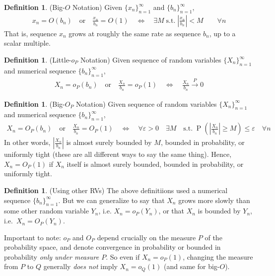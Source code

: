 \documentclass[12pt]{article}
\theoremstyle{plain}
\theoremstyle{definition}
\newtheorem{defn}[thm]{Definition}
\theoremstyle{remark}
\newcommand{\Prb}{\operatorname{P}}
\newcommand{\pto}{\xrightarrow{P}}
\newcommand{\ninf}{_{n=1}^\infty}
\begin{document}
\begin{defn}(Big-$O$ Notation)
Given $\{x_n\}_{n=1}^\infty$ and $\{b_n\}_{n=1}^\infty$,
\begin{align*}
  x_n = O(b_n)
  \quad\text{or} \quad
  \frac{x_n}{b_n} = O(1)
  \quad \iff \quad
  \exists M \; \text{s.t.} \;
  \left\lvert
  \frac{x_n}{b_n}
  \right\rvert
  < M
  \qquad \forall n
\end{align*}
That is, sequence $x_n$ grows at roughly the same rate as sequence
$b_n$, up to a scalar multiple.
\end{defn}

\begin{defn}(Little-$o_P$ Notation)
Given sequence of random variables $\{X_n\}_{n=1}^\infty$ and numerical
sequence $\{b_n\}_{n=1}^\infty$,
\begin{align*}
  X_n = o_P(b_n)
  \quad\text{or} \quad
  \frac{X_n}{b_n} = o_P(1)
  \quad \iff \quad
  \frac{X_n}{b_n} \pto 0
\end{align*}
\end{defn}

\begin{defn}(Big-$O_P$ Notation)
Given sequence of random variables $\{X_n\}_{n=1}^\infty$ and
numerical sequence $\{b_n\}_{n=1}^\infty$,
\begin{align*}
  X_n = O_P(b_n)
  \quad\text{or} \quad
  \frac{X_n}{b_n} = O_P(1)
  \quad \iff \quad
  \forall \varepsilon>0 \quad
  \exists M\quad
  \text{s.t.} \;
  \Prb\left(
  \left\lvert
  \frac{X_n}{b_n}
  \right\rvert
   \geq M\right)
  \leq \varepsilon
  \quad \forall n
\end{align*}
In other words, $\left\lvert\frac{X_n}{b_n}\right\rvert$ is almost surely
bounded by $M$, bounded in probability, or uniformly tight (these are
all different ways to say the same thing). Hence, $X_n=O_P(1)$ if $X_n$
itself is almost surely bounded, bounded in probability, or uniformly
tight.
\end{defn}

\begin{defn}(Using other RVs)
The above definitiions used a numerical sequence $\{b_n\}\ninf$.
But we can generalize to say that $X_n$ grows more slowly than some
other random variable $Y_n$, i.e. $X_n = o_P(Y_n)$, or that $X_n$ is
bounded by $Y_n$, i.e.\ $X_n=O_P(Y_n)$.
\end{defn}

Important to note: $o_P$ and $O_P$ depend crucially on the measure $P$
of the probability space, and denote convergence in probability or
bounded in probability \emph{only under measure $P$}.
So even if $X_n=o_P(1)$, changing the measure from $P$
to $Q$ generally \emph{does not} imply $X_n= o_Q(1)$ (and same for
big-$O$).
\end{document}
